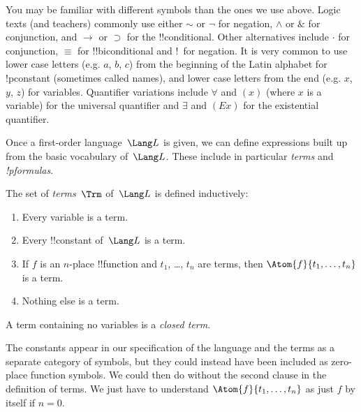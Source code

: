 \documentclass[../../include/open-logic-section]{subfiles}
\begin{document}

\begin{intro}
You may be familiar with different symbols than the ones we use
above. Logic texts (and teachers) commonly use either $\sim$ or $\neg$
for negation, $\wedge$ or $\&$ for conjunction, and $\rightarrow$ or
$\supset$ for the !!{conditional}. Other alternatives include $\cdot$ for
conjunction, $\equiv$ for !!{biconditional} and !~for negation. It is very
common to use lower case letters (e.g. $a$, $b$, $c$) from the
beginning of the Latin alphabet for !p{constant} (sometimes called
names), and lower case letters from the end (e.g. $x$, $y$, $z$)
for variables. Quantifier variations include $\forall$ and $(x)$
(where $x$ is a variable) for the universal quantifier and
$\exists$ and $(Ex)$ for the existential quantifier.
\end{intro}


\begin{wordy}
Once a first-order language~$\Lang L$ is given, we can define
expressions built up from the basic vocabulary of~$\Lang L$.  These
include in particular \emph{terms} and \emph{!p{formulas}}.
\end{wordy}

\begin{defn}[Term]
The set of \emph{terms}~$\Trm$ of~$\Lang L$ is
defined inductively:
\begin{enumerate}
\item Every variable is a term.
\item Every !!{constant} of~$\Lang L$ is a term.
\item If $f$ is an $n$-place !!{function} and $t_1$, \dots, $t_n$
  are terms, then $\Atom{f}{t_1, \ldots, t_n}$ is a term.
\item Nothing else is a term.
\end{enumerate}
A term containing no variables is a \emph{closed term}.
\end{defn}

\begin{wordy}
The constants appear in our specification of the language and the
terms as a separate category of symbols, but they could instead have
been included as zero-place function symbols.  We could then do
without the second clause in the definition of terms. We just have to
understand $\Atom{f}{t_1, \ldots, t_n}$ as just $f$ by itself if $n =
0$.
\end{wordy}
\end{document}
